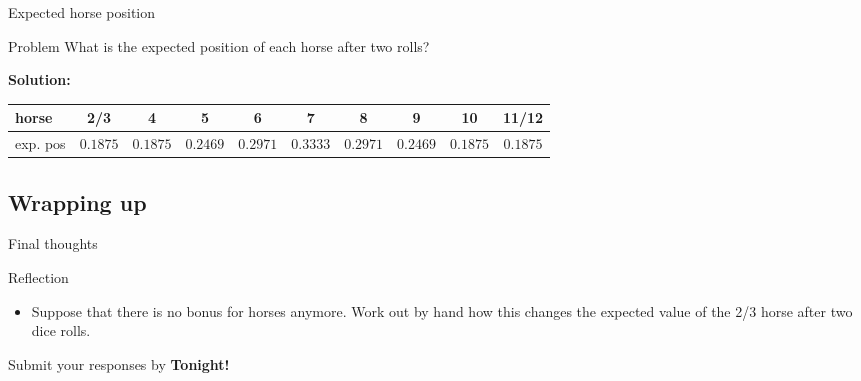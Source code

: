 \documentclass{beamer}
\begin{document}
\begin{frame}{Expected horse position}
  \begin{block}{Problem}
    What is the expected position of each horse after two rolls?
  \end{block}
\pause
  \textbf{Solution:}
  {\tiny
  \begin{center}
    \begin{tabular}{l|c|c|c|c|c|c|c|c|c|}
      horse    & 2/3 & 4 & 5 & 6 & 7 & 8 & 9 & 10 & 11/12\\\hline
      exp. pos & $0.1875$ & $0.1875$ & $0.2469$ & $0.2971$ & $0.3333$ & $0.2971$ & $0.2469$ & $0.1875$ & $0.1875$
    \end{tabular}
  \end{center}
  }
\end{frame}
\subsection{Wrapping up}

\begin{frame}{Final thoughts}
  \begin{block}{Reflection}
    \begin{itemize}
\pause
      \item Suppose that there is no bonus for horses anymore.  Work out by hand how this changes the expected value of the 2/3 horse after two dice rolls.
    \end{itemize}
  \end{block}
\begin{center}
Submit your responses by \textbf{Tonight!}
\end{center}
\end{frame}
\end{document}
